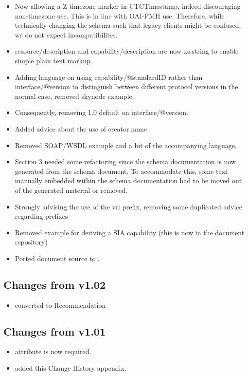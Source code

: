 \documentclass[11pt,a4paper]{ivoa}
\begin{document}
\begin{itemize}
\item Now allowing a Z timezone marker in UTCTimestamp, indeed
discouraging non-timezone use.  This is in line with OAI-PMH use.
Therefore, while technically changing the schema such that legacy
clients  might be confused, we do not expect incompatibilites.

\item resource/description and capability/description are now xs:string
to enable simple plain text markup.

\item Adding language on using capability/@standardID rather than
interface/@ver\-sion to distinguish between different protocol versions in
the normal case, removed skynode example.

\item Consequently, removing 1.0 default on interface/@version.

\item Added advice about the use of creator.name

\item Removed SOAP/WSDL example and a bit of the accompanying language.

\item Section 3 needed some refactoring since the schema documentation
is now generated from the schema document.  To accommodate this, some
text manually embedded within the schema documentation had to be moved
out of the generated material or removed.

\item Strongly advising the use of the vr: prefix, removing some
duplicated advice regarding prefixes

\item Removed example for deriving a SIA capability (this is now
in the document repository)

\item Ported document source to \ivoatex.
\end{itemize}

\subsection{Changes from v1.02}
\begin{itemize}
  \item converted to Recommendation
\end{itemize}

\subsection{Changes from v1.01}
\begin{itemize}
  \item {} attribute is now required.
  \item added this Change History appendix.
\end{itemize}
\end{document}
